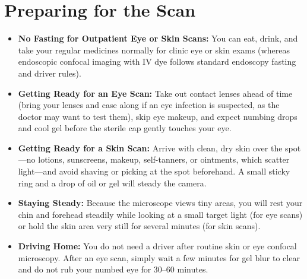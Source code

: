 \section{Preparing for the Scan}
\begin{itemize}
    \item \textbf{No Fasting for Outpatient Eye or Skin Scans:} You can eat, drink, and take your regular medicines normally for clinic eye or skin exams (whereas endoscopic confocal imaging with IV dye follows standard endoscopy fasting and driver rules).
    \item \textbf{Getting Ready for an Eye Scan:} Take out contact lenses ahead of time (bring your lenses and case along if an eye infection is suspected, as the doctor may want to test them), skip eye makeup, and expect numbing drops and cool gel before the sterile cap gently touches your eye.
    \item \textbf{Getting Ready for a Skin Scan:} Arrive with clean, dry skin over the spot---no lotions, sunscreens, makeup, self-tanners, or ointments, which scatter light---and avoid shaving or picking at the spot beforehand. A small sticky ring and a drop of oil or gel will steady the camera.
    \item \textbf{Staying Steady:} Because the microscope views tiny areas, you will rest your chin and forehead steadily while looking at a small target light (for eye scans) or hold the skin area very still for several minutes (for skin scans).
    \item \textbf{Driving Home:} You do not need a driver after routine skin or eye confocal microscopy. After an eye scan, simply wait a few minutes for gel blur to clear and do not rub your numbed eye for 30--60 minutes.
\end{itemize}

